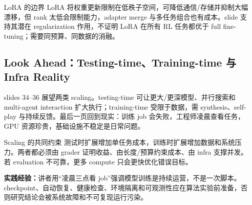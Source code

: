 \begin{knowledgebox}{LoRA 的边界}
LoRA 将权重更新限制在低秩子空间，可降低通信/存储并抑制大幅漂移，但 rank 太低会限制能力，adapter merge 与多任务组合也有成本。slide 支持其潜在 regularization 作用，不证明 LoRA 在所有 RL 任务都优于 full fine-tuning；需要同预算、同数据的消融。
\end{knowledgebox}

\subsection{Look Ahead：Testing-time、Training-time 与 Infra Reality}

slides 34--36 展望两类 scaling。testing-time 可让更大/更深模型、并行搜索和 multi-agent interaction 扩大执行；training-time 受限于数据，需 synthesis、self-play 与持续反馈。最后一页回到现实：训练 job 会失败，工程师凌晨查看任务，GPU 资源珍贵，基础设施不稳定是日常问题。


\begin{importantbox}{Scaling 的共同约束}
测试时扩展增加单任务成本，训练时扩展增加数据和系统压力。两者都必须由 grader 证明收益、由长度/预算约束成本、由 infra 支撑并发。若 evaluation 不可靠，更多 compute 只会更快优化错误目标。
\end{importantbox}

\textbf{实践经验：}讲者用“凌晨三点看 job”强调模型训练是持续运营，不是一次脚本。checkpoint、自动恢复、健康检查、环境隔离和可观测性应在算法实验前准备，否则研究结论会被系统故障和不可复现运行污染。

